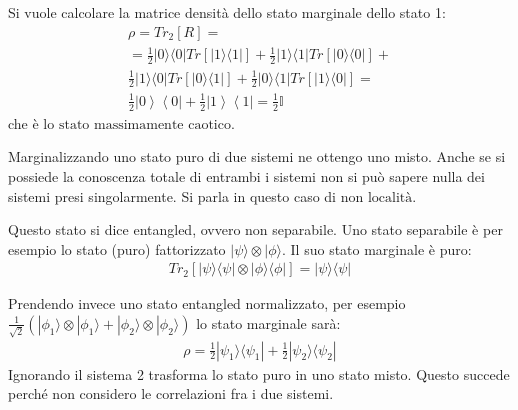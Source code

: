 Si vuole calcolare la matrice densità dello stato marginale dello stato 1:
\begin{equation}\begin{split}
\rho=Tr_2\left[R\right]=\\
=\frac{1}{2}|0\rangle\langle0|Tr\left[|1\rangle\langle1|\right]+\frac{1}{2}|1\rangle\langle1|Tr\left[|0\rangle\langle0|\right]+\\
\frac{1}{2}|1\rangle\langle0|Tr\left[|0\rangle\langle1|\right]+\frac{1}{2}|0\rangle\langle1|Tr\left[|1\rangle\langle0|\right]=\\
\frac{1}{2}\left |0 \right\rangle\left\langle 0\right |+\frac{1}{2}\left |1 \right\rangle\left\langle 1\right |=\frac{1}{2}\mathbb{I}
\end{split}\end{equation}
che è lo $\textrm{stato massimamente caotico}$.

Marginalizzando uno stato puro di due sistemi ne ottengo uno misto. Anche se si possiede la conoscenza totale di entrambi i sistemi non si può sapere nulla dei sistemi presi singolarmente. Si parla in questo caso di $\textrm{non località}$.

Questo stato si dice entangled, ovvero non separabile. Uno stato separabile è per esempio lo stato (puro) fattorizzato $|\psi\rangle \otimes |\phi\rangle$. Il suo stato marginale è puro:
\begin{equation}\begin{split}
Tr_2\left[|\psi\rangle\langle\psi| \otimes |\phi\rangle\langle\phi|\right]=|\psi\rangle\langle\psi|
\end{split}\end{equation}

Prendendo invece uno stato entangled normalizzato, per esempio $\frac{1}{\sqrt{2}}\left(|\phi_1\rangle \otimes |\phi_1\rangle+ |\phi_2\rangle \otimes |\phi_2\rangle\right)$ lo stato marginale sarà:
\begin{equation}\begin{split}
\rho=\frac{1}{2}|\psi_1\rangle\langle\psi_1|+\frac{1}{2}|\psi_2\rangle\langle\psi_2|
\end{split}\end{equation}
Ignorando il sistema 2 trasforma lo stato puro in uno stato misto. Questo succede perché non considero le correlazioni fra i due sistemi.

%
